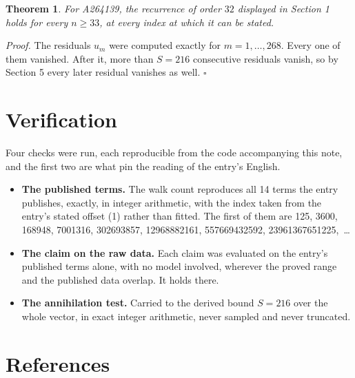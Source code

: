 \documentclass[11pt]{article}
\newtheorem{theorem}{Theorem}
\theoremstyle{definition}
\begin{document}
\begin{theorem} For A264139, the recurrence of order $32$ displayed in Section 1 holds for every $n \ge 33$, at every index at which it can be stated.\end{theorem}

{\itshape Proof.} The residuals $u_m$ were computed exactly for $m = 1,\dots,268$. Every one of them vanished. After it, more than $S = 216$ consecutive residuals vanish, so by Section 5 every later residual vanishes as well. $\square$

\section{Verification}

Four checks were run, each reproducible from the code accompanying this note, and the first two are what pin the reading of the entry's English.

\begin{itemize}

\item {\bfseries The published terms.} The walk count reproduces all 14 terms the entry publishes, exactly, in integer arithmetic, with the index taken from the entry's stated offset (1) rather than fitted. The first of them are 125, 3600, 168948, 7001316, 302693857, 12968882161, 557669432592, 23961367651225,~\dots

\item {\bfseries The claim on the raw data.} Each claim was evaluated on the entry's published terms alone, with no model involved, wherever the proved range and the published data overlap. It holds there.

\item {\bfseries The annihilation test.} Carried to the derived bound $S = 216$ over the whole vector, in exact integer arithmetic, never sampled and never truncated.

\end{itemize}

\section{References}
\end{document}
